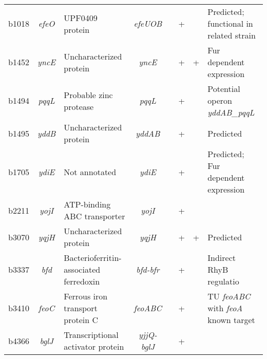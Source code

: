 \begin{sidewaystable}
\begin{scriptsize}
\begin{tabular}{ l c >{\raggedright}p{4cm} c c c 
>{\centering\arraybackslash}p{1.2cm} >{\raggedright\arraybackslash}p{4cm} }
	b1018 & \textit{efeO} & UPF0409 protein 		& \textit{efeUOB} & 
	  & + 	& 	& Predicted; functional in related strain \\[1ex]
	  
	b1452 & \textit{yncE} & Uncharacterized protein & \textit{yncE} & 
	  & + 	& + & Fur dependent expression \\[1ex]
	  
	b1494 & \textit{pqqL} & Probable zinc protease 	& \textit{pqqL} & 
	  & + 	& 	& Potential operon \textit{yddAB\_pqqL} \\[1ex]
	  
	b1495 & \textit{yddB} & Uncharacterized protein & \textit{yddAB} & 
	  & + 	&	& Predicted \\[1ex]
	  
	b1705 & \textit{ydiE} & Not annotated 			& \textit{ydiE} & 
	  & + 	& 	& Predicted; Fur dependent expression \\[1ex]
	  
	b2211 & \textit{yojI} & ATP-binding ABC transporter & \textit{yojI} & 
	  & + 	& 	& \\[1ex]
	  
	b3070 & \textit{yqjH} & Uncharacterized protein & \textit{yqjH} & 
	  & + 	& + & Predicted \\[1ex]
	  
	b3337 & \textit{bfd} & Bacterioferritin-associated ferredoxin & 
	\textit{bfd-bfr} & 
	  & + 	& 	& Indirect RhyB regulatio \\[1ex]
	  
	b3410 & \textit{feoC} & Ferrous iron transport protein C & \textit{feoABC} 
	& 
	  & + 	& 	& TU \textit{feoABC} with \textit{feoA} known target \\[1ex]
	  
	b4366 & \textit{bglJ} & Transcriptional activator protein & 
	\textit{yjjQ-bglJ} & 
	  & + 	& 	& \\[1ex]
	\bottomrule
\end{tabular}
\end{scriptsize}
\end{sidewaystable}

  

